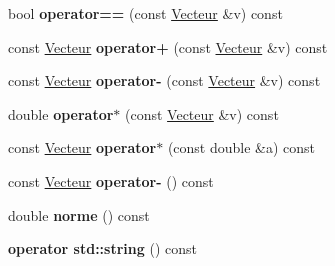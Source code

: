 \begin{DoxyCompactItemize}
\item 
\hypertarget{class_vecteur_ae748a1c896716a7983e53e1dbfdbb815}{bool {\bfseries operator==} (const \hyperlink{class_vecteur}{Vecteur} \&v) const }\label{class_vecteur_ae748a1c896716a7983e53e1dbfdbb815}

\item 
\hypertarget{class_vecteur_ae22b87d8ad6628b235bed15de8d8aaa2}{const \hyperlink{class_vecteur}{Vecteur} {\bfseries operator+} (const \hyperlink{class_vecteur}{Vecteur} \&v) const }\label{class_vecteur_ae22b87d8ad6628b235bed15de8d8aaa2}

\item 
\hypertarget{class_vecteur_ac01814448a6ecce07a03088c00504fb0}{const \hyperlink{class_vecteur}{Vecteur} {\bfseries operator-\/} (const \hyperlink{class_vecteur}{Vecteur} \&v) const }\label{class_vecteur_ac01814448a6ecce07a03088c00504fb0}

\item 
\hypertarget{class_vecteur_a45870b151569e48d0286ad2761e4c655}{double {\bfseries operator$\ast$} (const \hyperlink{class_vecteur}{Vecteur} \&v) const }\label{class_vecteur_a45870b151569e48d0286ad2761e4c655}

\item 
\hypertarget{class_vecteur_a5b537a840a32a9399456bc8a65b2f7ed}{const \hyperlink{class_vecteur}{Vecteur} {\bfseries operator$\ast$} (const double \&a) const }\label{class_vecteur_a5b537a840a32a9399456bc8a65b2f7ed}

\item 
\hypertarget{class_vecteur_a1b5f3856ab3c36ab39a168a9ba92accb}{const \hyperlink{class_vecteur}{Vecteur} {\bfseries operator-\/} () const }\label{class_vecteur_a1b5f3856ab3c36ab39a168a9ba92accb}

\item 
\hypertarget{class_vecteur_afa6e8ccd9771f87419077954cf96677a}{double {\bfseries norme} () const }\label{class_vecteur_afa6e8ccd9771f87419077954cf96677a}

\item 
\hypertarget{class_vecteur_a98103b18e3e8529e6d5f600689d67833}{{\bfseries operator std\+::string} () const }\label{class_vecteur_a98103b18e3e8529e6d5f600689d67833}

\end{DoxyCompactItemize}


